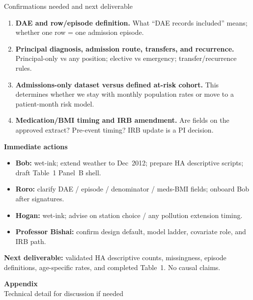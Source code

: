 \documentclass[aspectratio=169,10pt]{beamer}
\begin{document}
\begin{frame}{Confirmations needed and next deliverable}
  \footnotesize
  \begin{enumerate}
    \item \textbf{DAE and row/episode definition.} What ``DAE records included'' means; whether one row = one admission episode.
    \item \textbf{Principal diagnosis, admission route, transfers, and recurrence.} Principal-only vs any position; elective vs emergency; transfer/recurrence rules.
    \item \textbf{Admissions-only dataset versus defined at-risk cohort.} This determines whether we stay with monthly population rates or move to a patient-month risk model.
    \item \textbf{Medication/BMI timing and IRB amendment.} Are fields on the approved extract? Pre-event timing? IRB update is a PI decision.
  \end{enumerate}

  \vspace{0.35em}
  \textbf{Immediate actions}
  \vspace{0.15em}
  \begin{itemize}
    \item \textbf{Bob:} wet-ink; extend weather to Dec~2012; prepare HA descriptive scripts; draft Table~1 Panel~B shell.
    \item \textbf{Roro:} clarify DAE / episode / denominator / meds-BMI fields; onboard Bob after signatures.
    \item \textbf{Hogan:} wet-ink; advise on station choice / any pollution extension timing.
    \item \textbf{Professor Bishai:} confirm design default, model ladder, covariate role, and IRB path.
  \end{itemize}

  \vspace{0.45em}
  \textbf{Next deliverable:} validated HA descriptive counts, missingness, episode
  definitions, age-specific rates, and completed Table~1. No causal claims.
\end{frame}

\appendix
\begin{frame}[plain]
  \centering
  \vspace{2.2cm}
  {\Large\bfseries Appendix}\\[0.6em]
  {\small Technical detail for discussion if needed}
\end{frame}
\end{document}
